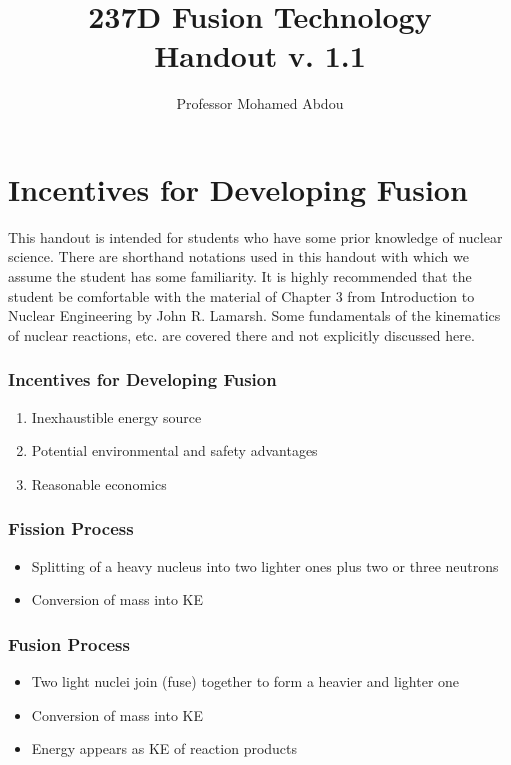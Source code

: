 \documentclass[11pt]{report} %
\title{237D Fusion Technology \\
Handout v. 1.1}
\author{Professor Mohamed Abdou}
\begin{document}
\maketitle
\chapter{Incentives for Developing Fusion}
\label{intro}
This handout is intended for students who have some prior knowledge of nuclear science. There are shorthand notations used in this handout with which we assume the student has some familiarity. It is highly recommended that the student be comfortable with the material of Chapter 3 from Introduction to Nuclear Engineering by John R. Lamarsh. Some fundamentals of the kinematics of nuclear reactions, etc. are covered there and not explicitly discussed here.
 
\subsection*{Incentives for Developing Fusion}
\begin{enumerate}
\item Inexhaustible energy source
\item Potential environmental and safety advantages
\item Reasonable economics
\end{enumerate}


\subsection*{Fission Process}
\begin{itemize}
\item Splitting of a heavy nucleus into two lighter ones plus two or three neutrons
\item Conversion of mass into KE
\end{itemize}


\subsection*{Fusion Process}
\begin{itemize}
\item Two light nuclei join (fuse) together to form a heavier and lighter one
\item Conversion of mass into KE
\item Energy appears as KE of reaction products
\end{itemize}
\end{document}
